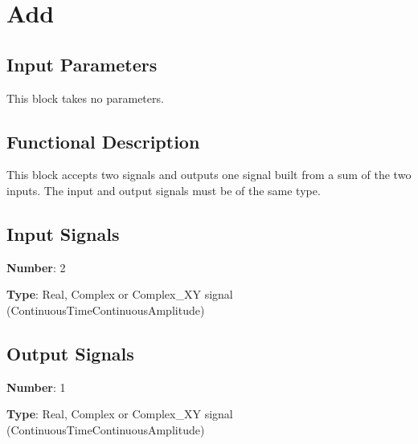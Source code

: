 \clearpage

\section{Add}

\subsection*{Input Parameters}

This block takes no parameters.

\subsection*{Functional Description}

This block accepts two signals and outputs one signal built from a sum of the two inputs. The input and output signals must be of the same type.

\subsection*{Input Signals}

\textbf{Number}: 2

\textbf{Type}: Real, Complex or Complex\_XY signal (ContinuousTimeContinuousAmplitude)

\subsection*{Output Signals}

\textbf{Number}: 1

\textbf{Type}: Real, Complex or Complex\_XY signal (ContinuousTimeContinuousAmplitude)

% 